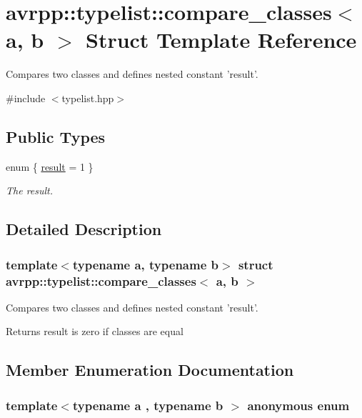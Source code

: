 \hypertarget{structavrpp_1_1typelist_1_1compare__classes}{
\section{avrpp::typelist::compare\_\-classes$<$ a, b $>$ Struct Template Reference}
\label{structavrpp_1_1typelist_1_1compare__classes}
}


Compares two classes and defines nested constant 'result'.  




{\ttfamily \#include $<$typelist.hpp$>$}

\subsection*{Public Types}
\begin{DoxyCompactItemize}
\item 
enum \{ \hyperlink{structavrpp_1_1typelist_1_1compare__classes_a0b5562bc41787c1145fc1465c86e71a8af5720a2383fcf8183138b4404609001a}{result} = 1
 \}
\begin{DoxyCompactList}\small\item\em The result. \item\end{DoxyCompactList}\end{DoxyCompactItemize}


\subsection{Detailed Description}
\subsubsection*{template$<$typename a, typename b$>$ struct avrpp::typelist::compare\_\-classes$<$ a, b $>$}

Compares two classes and defines nested constant 'result'. \begin{DoxyReturn}{Returns}
result is zero if classes are equal 
\end{DoxyReturn}


\subsection{Member Enumeration Documentation}
\hypertarget{structavrpp_1_1typelist_1_1compare__classes_a0b5562bc41787c1145fc1465c86e71a8}{
\subsubsection[{"@28}]{\setlength{\rightskip}{0pt plus 5cm}template$<$typename a , typename b $>$ anonymous enum}}
\label{structavrpp_1_1typelist_1_1compare__classes_a0b5562bc41787c1145fc1465c86e71a8}


